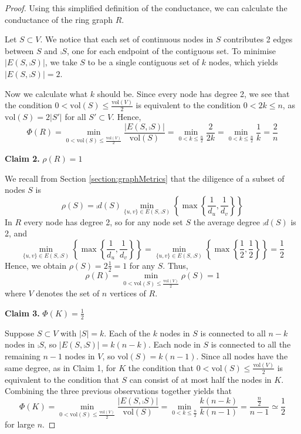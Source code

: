 \begin{proof}
Using this simplified definition of the conductance, we can calculate the conductance of the ring graph $R$. 

Let $S \subset V$.  We notice that each set of continuous nodes in $S$ contributes 2 edges between $S$ and $\comp{S}$, one for each endpoint of the contiguous set. %
To minimise $|E(S, \comp{S})|$, we take $S$ to be a single contiguous set of $k$ nodes, which yields $|E(S, \comp{S})| = 2$. 

Now we calculate what $k$ should be. Since every node has degree 2, we see that the condition $0 < \text{vol}(S) \leq \frac{\text{vol}(V)}{2}$ is equivalent to the condition $0 < 2k \leq n$, as $\text{vol}(S) = 2|S'|$ for all $S' \subset V$. Hence,
$$
	\Phi(R) 
	=\min_{0 < \text{vol}(S) \leq \frac{\text{vol}(V)}{2}} \frac{|E(S, \comp{S})|}{\text{vol}(S)} 
	= \min_{0 < k \leq \frac{n}{2}} \frac{2}{2k} 
	= \min_{0 < k \leq \frac{n}{2}} \frac{1}{k} 
	= \frac{2}{n}
$$

\textbf{Claim 2.} $\rho(R)=1$

We recall from Section \ref{section:graphMetrics} that the diligence of a subset of nodes $S$ is
$$
\rho(S) = \comp{d}(S) \min_{\{u, v\} \in E(S, \comp{S}) } \left\{ \max \left\{ \frac{1}{d_u},\frac{1}{d_v} \right\} \right\}
$$ 
In $R$ every node has degree 2, so for any node set $S$ the average degree $\comp{d}(S)$ is 2, and 
$$
	\min_{\{u, v\} \in E(S, \comp{S}) } \left\{ \max \left\{ \frac{1}{d_u},\frac{1}{d_v} \right\} \right\}
	= 
	\min_{\{u, v\} \in E(S, \comp{S}) } \left\{ \max \left\{ \frac{1}{2},\frac{1}{2} \right\} \right\}
	=
	\frac{1}{2}
$$
Hence, we obtain $\rho(S) = 2 \frac{1}{2} = 1$ for any $S$. Thus, 
$$
	\rho(R) =  \min_{0 < \text{vol}(S) \leq \frac{\text{vol}(V)}{2}} \rho(S) = 1 
$$
where $V$ denotes the set of $n$ vertices of $R$.

\textbf{Claim 3.}  $\Phi(K)=\frac{1}{2}$

Suppose $S \subset V$ with $|S| = k$. Each of the $k$ nodes in $S$ is connected to all $n - k$ nodes in $\comp{S}$, so $|E(S, \comp{S})| = k(n - k)$. Each node in $S$ is connected to all the remaining $n - 1$ nodes in $V$, so $\text{vol}(S) = k(n-1)$. Since all nodes have the same degree, as in Claim 1, for $K$ the condition that $0 < \text{vol}(S) \leq \frac{\text{vol}(V)}{2}$ is equivalent to the condition that $S$ can consist of at most half the nodes in $K$. Combining the three previous observations together yields that
$$
	\Phi(K) = \min_{0 < \text{vol}(S) \leq \frac{\text{vol}(V)}{2}} \frac{|E(S, \comp{S})|}{\text{vol}(S)} 
	= \min_{0 < k \leq \frac{n}{2}} \frac{k(n-k)}{k(n-1)} 
	= \frac{\frac{n}{2}}{n-1}
	\simeq \frac{1}{2}
$$
for large $n$.


\end{proof}
